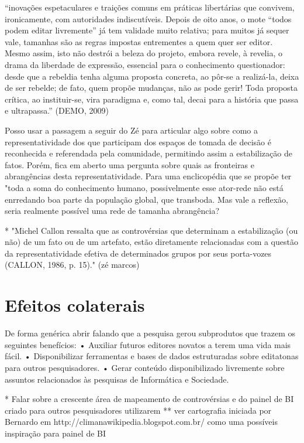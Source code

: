 ``inovações espetaculares e traições comuns em práticas libertárias que convivem, ironicamente, com autoridades indiscutíveis. Depois de oito anos, o mote “todos podem editar livremente” já tem validade muito relativa; para muitos já sequer vale, tamanhas são as regras impostas entrementes a quem quer ser editor. Mesmo assim, isto não destrói a beleza do projeto, embora revele, à revelia, o drama da liberdade de expressão, essencial para o conhecimento questionador: desde que a rebeldia tenha alguma proposta concreta, ao pôr-se a realizá-la, deixa de ser rebelde; de fato, quem propõe mudanças, não as pode gerir! Toda proposta crítica, ao instituir-se, vira paradigma e, como tal, decai para a história que passa e ultrapassa.'' (DEMO, 2009)

Posso usar a passagem a seguir do Zé para articular algo sobre como a representatividade dos que participam dos espaços de tomada de decisão é reconhecida e referendada pela comunidade, permitindo assim a estabilização de fatos. Porém, fica em aberto uma pergunta sobre quais as fronteiras e abrangências desta representatividade. Para uma enclicopédia que se propõe ter "toda a soma do conhecimento humano, possivelmente esse ator-rede não está enrredando boa parte da população global, que transboda. Mas vale a reflexão, seria realmente possível uma rede de tamanha abrangência?

* "Michel Callon ressalta que as controvérsias que determinam a estabilização (ou não) de um fato ou de um artefato, estão diretamente relacionadas com a questão da representatividade efetiva de determinados grupos por seus porta-vozes (CALLON, 1986, p. 15)." (zé marcos)

\section{Efeitos colaterais}

De forma genérica abrir falando que a pesquisa gerou subprodutos que trazem os seguintes benefícios:
    • Auxiliar futuros editores novatos a terem uma vida mais fácil.
    • Disponibilizar ferramentas e bases de dados estruturadas sobre editatonas para outros pesquisadores.
    • Gerar conteúdo disponibilizado livremente sobre assuntos relacionados às pesquisas de Informática e Sociedade.
    
* Falar sobre a crescente área de mapeamento de controvérsias e do painel de BI criado para outros pesquisadores utilizarem
** ver cartografia iniciada por Bernardo em http://climanawikipedia.blogspot.com.br/ como uma possíveis inspiração para painel de BI


